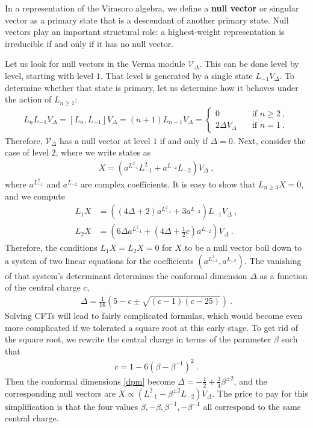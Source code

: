 \documentclass[12pt, a4paper]{article}
\newcommand{\myindex}[1]{\textbf{\boldmath #1}}
\theoremstyle{break}
\begin{document}
In a representation of the Virasoro algebra, we define a \myindex{null vector} or singular vector as a primary state that is a descendant of another primary state. Null vectors play an important structural role: a highest-weight representation is irreducible if and only if it has no null vector. 

Let us look for null vectors in the Verma module $\mathcal{V}_\Delta$. This can be done level by level, starting with level $1$. That level is generated by a single state $L_{-1}V_\Delta$. To determine whether that state is primary, let us determine how it behaves under the action of $L_{n\geq 1}$:
\begin{align}
L_n L_{-1}V_\Delta = [L_n, L_{-1}] V_\Delta = (n+1) L_{n-1}V_\Delta = 
\left\{\begin{array}{ll} 0 &  \quad \text{if } n\geq 2\ , \\ 2\Delta V_\Delta & \quad \text{if } n = 1\ . \end{array}\right. 
\end{align}
Therefore, $\mathcal{V}_\Delta$ has a null vector at level $1$ if and only if $\Delta=0$. Next, consider the case of level $2$, where we write states as 
\begin{align}
 X{} = \left(a^{L_{-1}^2} L_{-1}^2 + a^{L_{-2}} L_{-2}\right) V_\Delta\ ,
\end{align}
where $a^{L_{-1}^2}$ and $a^{L_{-2}}$ are complex coefficients. It is easy to show that $L_{n\geq 3}X{}=0$, and we compute 
\begin{align}
 L_1X{} &= \left((4\Delta+2)a^{L_{-1}^2} + 3a^{L_{-2}}\right) L_{-1}V_\Delta\ ,
 \label{l1c}
\\
L_2 X{} &= \left(6\Delta a^{L_{-1}^2}+(4\Delta+\tfrac12 c) a^{L_{-2}}\right)V_\Delta\ .
\label{l2c}
\end{align}
Therefore, the conditions $L_1X{}=L_2 X{}=0$ for $X{}$ to be a null vector boil down to a system of two linear equations for the coefficients $(a^{L_{-1}^2},a^{L_{-2}})$. The vanishing of that system's determinant determines the conformal dimension $\Delta$ as a function of the central charge $c$,
\begin{align}
 \Delta = \frac{1}{16}\left( 5-c\pm\sqrt{(c-1)(c-25)} \right) \ .
 \label{dpm}
\end{align}
Solving CFTs will lead to fairly complicated formulas, which would become even more complicated if we tolerated a square root at this early stage.
To get rid of the square root, we rewrite the central charge in terms of the parameter $\beta$ such that 
\begin{align}
 \boxed{c = 1- 6\left(\beta - \beta^{-1}\right)^2 } \ .
 \label{cb}
\end{align}
Then the conformal dimensions \eqref{dpm} become 
$
 \Delta = -\frac12 + \frac34\beta^{\pm 2}
$, and the corresponding null vectors are $X\propto \left(L_{-1}^2 -\beta^{\pm 2}L_{-2}\right)V_\Delta$.
The price to pay for this simplification is that the four values $\beta,-\beta,\beta^{-1},-\beta^{-1}$ all correspond to the same central charge. 
\end{document}
